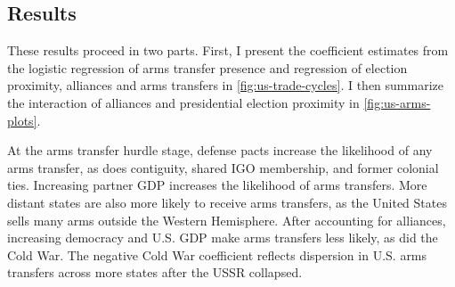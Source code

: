 \documentclass[12pt]{article}
\begin{document}
\subsection{Results}


These results proceed in two parts.
First, I present the coefficient estimates from the logistic regression of arms transfer presence and regression of election proximity, alliances and arms transfers in \autoref{fig:us-trade-cycles}.
I then summarize the interaction of alliances and presidential election proximity in \autoref{fig:us-arms-plots}.


At the arms transfer hurdle stage, defense pacts increase the likelihood of any arms transfer, as does contiguity, shared IGO membership, and former colonial ties.
Increasing partner GDP increases the likelihood of arms transfers.
More distant states are also more likely to receive arms transfers, as the United States sells many arms outside the Western Hemisphere. 
After accounting for alliances, increasing democracy and U.S. GDP make arms transfers less likely, as did the Cold War. 
The negative Cold War coefficient reflects dispersion in U.S. arms transfers across more states after the USSR collapsed.
\end{document}
